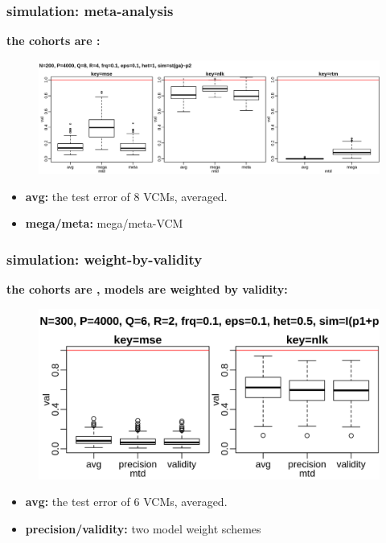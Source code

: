 \documentclass{beamer}
\begin{document}
\begin{frame}%
  \frametitle{simulation: meta-analysis} %
  \textbf{the cohorts are \color{red}{heterogeneous}:} \\
  \begin{figure}
    \centering \includegraphics[width=.95\linewidth]{img/met_het_stt_mnq_ssz}
  \end{figure}
  \textbf{\color{blue}{inner plot: strategies, from left to right:}}
  \begin{itemize}
  \item \textbf{avg:} the test error of 8 VCMs, averaged.
  \item \textbf{mega/meta:} mega/meta-VCM
  \end{itemize}
\end{frame}
\begin{frame}%
  \frametitle{simulation: weight-by-validity} %
  \textbf{the cohorts are \color{red}{heterogeneous}, models are
    weighted by validity:}
  \begin{figure}
    \centering \includegraphics[width=.90\linewidth]{img/met_het_mnq_nlk}
  \end{figure}
  \textbf{\color{blue}{inner plot: strategies, from left to right:}}
  \begin{itemize}
  \item \textbf{avg:} the test error of 6 VCMs, averaged.
  \item \textbf{precision/validity:} two model weight schemes
  \end{itemize}
\end{frame}
\end{document}
